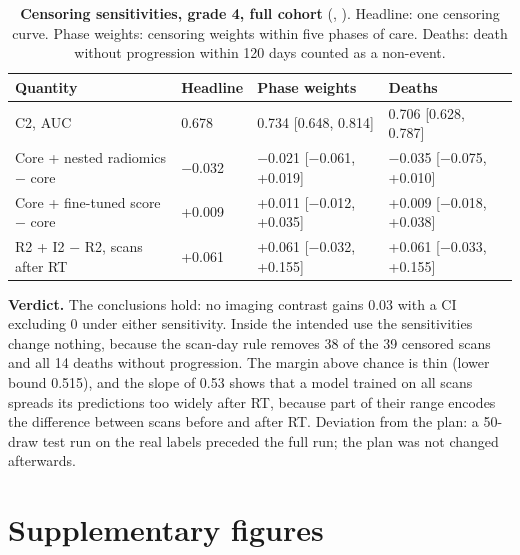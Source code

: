 \documentclass[11pt,a4paper]{article}
\begin{document}
\begin{table}[H]
\centering
\small
\renewcommand{\thetable}{S45}\renewcommand{\theHtable}{S45}
\caption{\textbf{Censoring sensitivities, grade 4, full cohort} (, ). Headline:
one censoring curve. Phase weights: censoring weights within five phases of care. Deaths: death without progression
within 120 days counted as a non-event.}
\label{tab:S45}
\begin{tabularx}{\linewidth}{@{}L R{1.5cm} R{3.1cm} R{3.1cm}@{}}
\toprule
Quantity & Headline & Phase weights & Deaths \\
\midrule
C2, AUC & 0.678 & 0.734 [0.648, 0.814] & 0.706 [0.628, 0.787] \\
Core + nested radiomics $-$ core & $-$0.032 & $-$0.021 [$-$0.061, +0.019] & $-$0.035 [$-$0.075, +0.010] \\
Core + fine-tuned score $-$ core & +0.009 & +0.011 [$-$0.012, +0.035] & +0.009 [$-$0.018, +0.038] \\
R2 + I2 $-$ R2, scans after RT & +0.061 & +0.061 [$-$0.032, +0.155] & +0.061 [$-$0.033, +0.155] \\
\bottomrule
\end{tabularx}
\end{table}

\textbf{Verdict.} The conclusions hold: no imaging contrast gains 0.03 with a CI excluding 0 under either
sensitivity. Inside the intended use the sensitivities change nothing, because the scan-day rule removes 38 of the
39 censored scans and all 14 deaths without progression. The margin above chance is thin (lower bound 0.515), and
the slope of 0.53 shows that a model trained on all scans spreads its predictions too widely after RT, because part
of their range encodes the difference between scans before and after RT. Deviation from the plan: a 50-draw test
run on the real labels preceded the full run; the plan was not changed afterwards.

\FloatBarrier
\section*{Supplementary figures}
\end{document}

